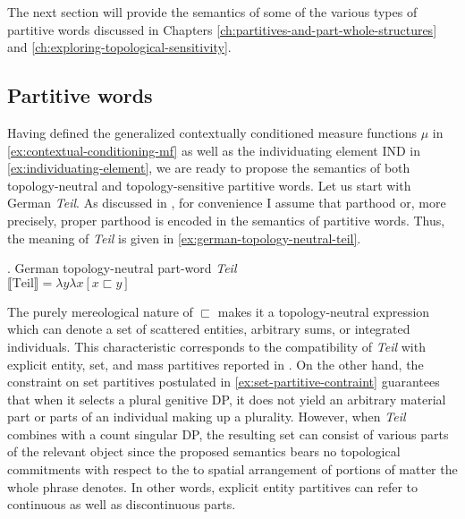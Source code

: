 	The next section will provide the semantics of some of the various types of partitive words discussed in Chapters \ref{ch:partitives-and-part-whole-structures} and \ref{ch:exploring-topological-sensitivity}.
	
	\subsection{Partitive words}\label{sec:partitive-words}
	
	Having defined the generalized contextually conditioned measure functions $\mu$ in \ref{ex:contextual-conditioning-mf} as well as the individuating element IND in \ref{ex:individuating-element}, we are ready to propose the semantics of both topology-neutral and topology-sensitive partitive words. Let us start with German \textit{Teil}. As discussed in , for convenience I assume that parthood or, more precisely, proper parthood is encoded in the semantics of partitive words. Thus, the meaning of \textit{Teil} is given in \ref{ex:german-topology-neutral-teil}. 
	
	\ex. German topology-neutral part-word \textit{Teil}\\
	$\llbracket \text{Teil}\rrbracket = \lambda y \lambda x [x \sqsubset y]$\label{ex:german-topology-neutral-teil}
	
	\begin{sloppypar}
	The purely mereological nature of $\sqsubset$ makes it a topology-neutral expression which can denote a set of scattered entities, arbitrary sums, or integrated individuals. This characteristic corresponds to the compatibility of \textit{Teil} with explicit entity, set, and mass partitives reported in . On the other hand, the constraint on set partitives postulated in \ref{ex:set-partitive-contraint} guarantees that when it selects a plural genitive DP, it does not yield an arbitrary material part or parts of an  individual making up a plurality. However, when \textit{Teil} combines with a count singular DP, the resulting set can consist of various parts of the relevant object since the proposed semantics bears no topological commitments with respect to the to spatial arrangement of portions of matter the whole phrase denotes. In other words, explicit entity partitives can refer to continuous as well as discontinuous parts.
	\end{sloppypar}
	

